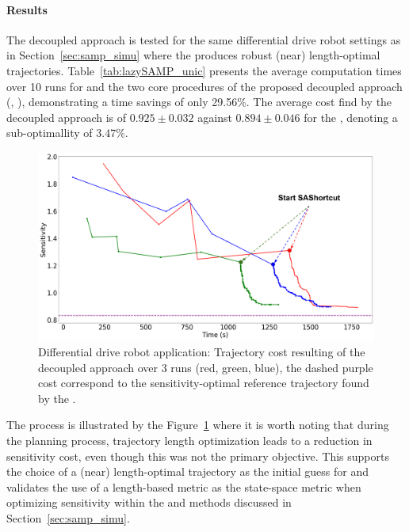 \paragraph{Results}



The decoupled approach is tested for the same differential drive robot settings as in Section~\ref{sec:samp_simu} where the  produces robust (near) length-optimal trajectories.
Table~\ref{tab:lazySAMP_unic} presents the average computation times over 10 runs for  and the two core procedures of the proposed decoupled approach (, ), demonstrating a time savings of only 29.56\%.
The average cost find by the decoupled approach is of $0.925 \pm 0.032$ against $0.894 \pm 0.046$ for the , denoting a sub-optimallity of $3.47\%$.

\begin{figure}[h!]
    \centering
    \includegraphics[width=0.7\linewidth]{figures/samp/sensi_cost_unic.png}
    \caption{Differential drive robot application: Trajectory cost resulting of the decoupled approach over 3 runs (red, green, blue), the dashed purple cost correspond to the sensitivity-optimal reference trajectory found by the .}
    \label{fig:sensi_cost_unic}
\end{figure}

The process is illustrated by the Figure~\ref{fig:sensi_cost_unic} where it is worth noting that during the  planning process, trajectory length optimization leads to a reduction in sensitivity cost, even though this was not the primary objective. 
This supports the choice of a (near) length-optimal trajectory as the initial guess for  and validates the use of a length-based metric as the state-space metric when optimizing sensitivity within the  and  methods discussed in Section~\ref{sec:samp_simu}.

